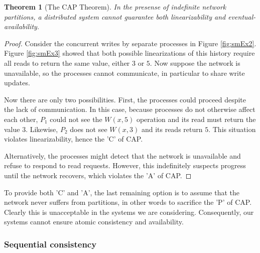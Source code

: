 \documentclass[]             %
{NASA}                       %
\newtheorem{theorem}{Theorem}[section]
\theoremstyle{definition}
\begin{document}
\begin{theorem}[The CAP Theorem]
  \label{thm:cap}
  In the presense of indefinite network partitions, a distributed system
  cannot guarantee both linearizability and eventual-availability.
\end{theorem}
\begin{proof}
  Consider the concurrent writes by separate processes in Figure
  \ref{fig:smEx2}.  Figure \ref{fig:smEx3} showed that both possible
  linearizations of this history require all reads to return the same
  value, either $3$ or $5$. Now suppose the network is unavailable, so
  the processes cannot communicate, in particular to share write
  updates.

  Now there are only two possibilities. First, the processes could
  proceed despite the lack of communication. In this case, because
  processes do not otherwise affect each other, $P_1$ could not see
  the $W(x,5)$ operation and its read must return the value
  $3$. Likewise, $P_2$ does not see $W(x,3)$ and its reads return
  $5$. This situation violates linearizability, hence the 'C' of CAP.

  Alternatively, the processes might detect that the network is
  unavailable and refuse to respond to read requests. However, this
  indefinitely suspects progress until the network recovers, which
  violates the 'A' of CAP.
\end{proof}

To provide both 'C' and 'A', the last remaining option is to assume
that the network never suffers from partitions, in other words to
sacrifice the 'P' of CAP. Clearly this is unacceptable in the systems
we are considering. Consequently, our systems cannot ensure atomic
consistency and availability.

\subsubsection{Sequential consistency}
\label{sequential-consistency}
\end{document}
